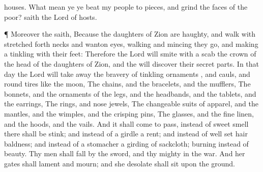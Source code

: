 {houses.
What mean ye
{} ye
beat my
people to
pieces, and
grind the
faces of the
poor?
saith the
Lord
{} of
hosts.
\par }{\PP {}¶ Moreover the
{}
saith,
Because the
daughters of
Zion are
haughty, and
walk with stretched
forth
necks and
wanton
eyes,
walking and
mincing
{} they
go, and making a
tinkling with their
feet:
Therefore the
Lord will smite with a
scab the crown of the
head of the
daughters of
Zion, and the
{} will
discover their secret
parts.
In that
day the
Lord will take
away the
bravery of
{} tinkling
ornaments
{}, and
{}
cauls, and
{} round tires like the
moon,
The
chains, and the
bracelets, and the
mufflers,
The
bonnets, and the ornaments of the
legs, and the
headbands, and the
tablets, and the
earrings,
The
rings, and
nose
jewels,
The changeable suits of
apparel, and the
mantles, and the
wimples, and the crisping
pins,
The
glasses, and the fine
linen, and the
hoods, and the
vails.
And it shall come to pass,
{} instead of sweet
smell there shall be
stink; and instead of a
girdle a
rent; and instead of well
set
hair
baldness; and instead of a
stomacher a
girding of
sackcloth;
{}
burning instead of
beauty.
Thy
men shall
fall by the
sword, and thy
mighty in the
war.
And her
gates shall
lament and
mourn; and she
{}
desolate shall
sit upon the
ground.

}
